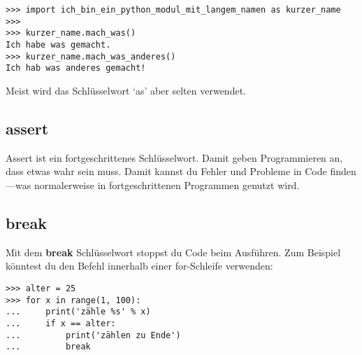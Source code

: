 
\begin{Verbatim}[frame=single]
>>> import ich_bin_ein_python_modul_mit_langem_namen as kurzer_name
>>>
>>> kurzer_name.mach_was()
Ich habe was gemacht.
>>> kurzer_name.mach_was_anderes()
Ich hab was anderes gemacht!
\end{Verbatim}

\noindent
Meist wird das Schlüsselwort `as' aber selten verwendet.

\subsection*{assert}

Assert ist ein fortgeschrittenes Schlüsselwort. Damit geben Programmieren an, dass etwas wahr sein muss. Damit kannst du Fehler und Probleme in Code finden---was normalerweise in fortgeschrittenen Programmen genutzt wird.

\subsection*{break}

Mit dem \textbf{break} Schlüsselwort stoppst du Code beim Ausführen. Zum Beispiel könntest du den Befehl innerhalb einer for-Schleife verwenden:

\begin{Verbatim}[frame=single]
>>> alter = 25
>>> for x in range(1, 100):
...     print('zähle %s' % x)
...     if x == alter:
...         print('zählen zu Ende')
...         break
\end{Verbatim}

